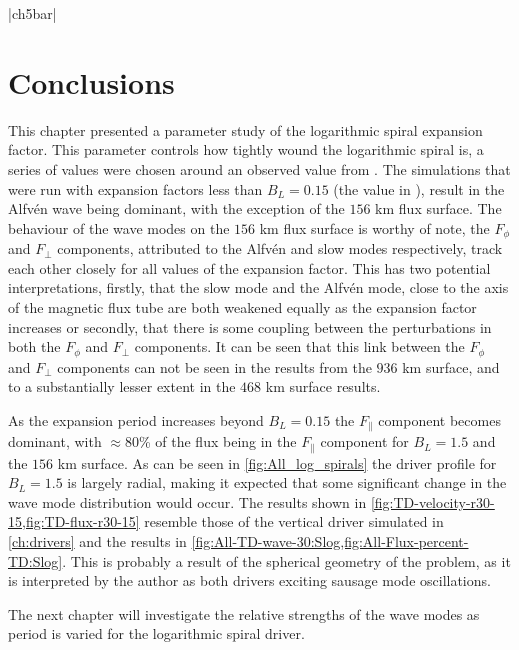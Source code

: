 \py[chapter5]|ch5bar|

\section{Conclusions}

This chapter presented a parameter study of the logarithmic spiral expansion factor.
This parameter controls how tightly wound the logarithmic spiral is, a series of values were chosen around an observed value from \cite{bonet2008}.
The simulations that were run with expansion factors less than $B_L=0.15$ (the value in \cite{bonet2008}), result in the Alfv\'en wave being dominant, with the exception of the $156$ km flux surface.
The behaviour of the wave modes on the $156$ km flux surface is worthy of note, the $F_\phi$ and $F_\perp$ components, attributed to the Alfv\'en and slow modes respectively, track each other closely for all values of the expansion factor.
This has two potential interpretations, firstly, that the slow mode and the Alfv\'en mode, close to the axis of the magnetic flux tube are both weakened equally as the expansion factor increases or secondly, that there is some coupling between the perturbations in both the $F_\phi$ and $F_\perp$ components.
It can be seen that this link between the $F_\phi$ and $F_\perp$ components can not be seen in the results from the $936$ km surface, and to a substantially lesser extent in the $468$ km surface results.

As the expansion period increases beyond $B_L=0.15$ the $F_\parallel$ component becomes dominant, with $\approx 80$\% of the flux being in the $F_\parallel$ component for $B_L=1.5$ and the $156$ km surface.
As can be seen in \cref{fig:All_log_spirals} the driver profile for $B_L=1.5$ is largely radial, making it expected that some significant change in the wave mode distribution would occur.
The results shown in \cref{fig:TD-velocity-r30-15,fig:TD-flux-r30-15} resemble those of the vertical driver simulated in \cref{ch:drivers} and the results in \cref{fig:All-TD-wave-30:Slog,fig:All-Flux-percent-TD:Slog}.
This is probably a result of the spherical geometry of the problem, as it is interpreted by the author as both drivers exciting sausage mode oscillations.


The next chapter will investigate the relative strengths of the wave modes as period is varied for the logarithmic spiral driver.

